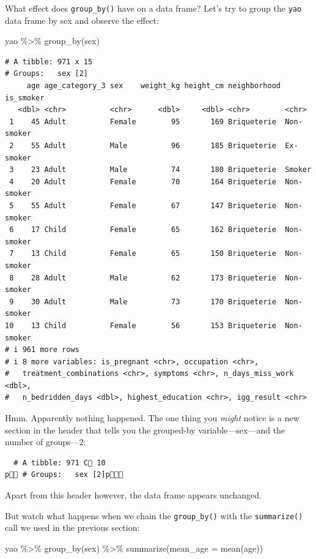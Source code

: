 \documentclass[
  letterpaper,
  DIV=11,
  numbers=noendperiod]{scrreprt}
\newenvironment{Shaded}{\begin{snugshade}}{\end{snugshade}}
\newcommand{\AttributeTok}[1]{\textcolor[rgb]{0.40,0.45,0.13}{#1}}
\newcommand{\FunctionTok}[1]{\textcolor[rgb]{0.28,0.35,0.67}{#1}}
\newcommand{\NormalTok}[1]{\textcolor[rgb]{0.00,0.23,0.31}{#1}}
\newcommand{\SpecialCharTok}[1]{\textcolor[rgb]{0.37,0.37,0.37}{#1}}
\begin{document}
What effect does \texttt{group\_by()} have on a data frame? Let's try to
group the \texttt{yao} data frame by sex and observe the effect:

\begin{Shaded}
\begin{Highlighting}[]
\NormalTok{yao }\SpecialCharTok{\%\textgreater{}\%} 
  \FunctionTok{group\_by}\NormalTok{(sex)}
\end{Highlighting}
\end{Shaded}

\begin{verbatim}
# A tibble: 971 x 15
# Groups:   sex [2]
     age age_category_3 sex    weight_kg height_cm neighborhood is_smoker 
   <dbl> <chr>          <chr>      <dbl>     <dbl> <chr>        <chr>     
 1    45 Adult          Female        95       169 Briqueterie  Non-smoker
 2    55 Adult          Male          96       185 Briqueterie  Ex-smoker 
 3    23 Adult          Male          74       180 Briqueterie  Smoker    
 4    20 Adult          Female        70       164 Briqueterie  Non-smoker
 5    55 Adult          Female        67       147 Briqueterie  Non-smoker
 6    17 Child          Female        65       162 Briqueterie  Non-smoker
 7    13 Child          Female        65       150 Briqueterie  Non-smoker
 8    28 Adult          Male          62       173 Briqueterie  Non-smoker
 9    30 Adult          Male          73       170 Briqueterie  Non-smoker
10    13 Child          Female        56       153 Briqueterie  Non-smoker
# i 961 more rows
# i 8 more variables: is_pregnant <chr>, occupation <chr>,
#   treatment_combinations <chr>, symptoms <chr>, n_days_miss_work <dbl>,
#   n_bedridden_days <dbl>, highest_education <chr>, igg_result <chr>
\end{verbatim}

Hmm. Apparently nothing happened. The one thing you \emph{might} notice
is a new section in the header that tells you the grouped-by
variable---sex---and the number of groups---2:

\begin{verbatim}
  # A tibble: 971 C 10
p # Groups:   sex [2]p
\end{verbatim}

Apart from this header however, the data frame appears unchanged.

But watch what happens when we chain the \texttt{group\_by()} with the
\texttt{summarize()} call we used in the previous section:

\begin{Shaded}
\begin{Highlighting}[]
\NormalTok{yao }\SpecialCharTok{\%\textgreater{}\%} 
  \FunctionTok{group\_by}\NormalTok{(sex) }\SpecialCharTok{\%\textgreater{}\%} 
  \FunctionTok{summarize}\NormalTok{(}\AttributeTok{mean\_age =} \FunctionTok{mean}\NormalTok{(age))}
\end{Highlighting}
\end{Shaded}
\end{document}
